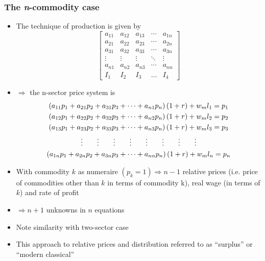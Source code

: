 \documentclass[a4paper,twoside]{article}
\numberwithin{equation}{section}
\numberwithin{figure}{section}
\begin{document}
\subsubsection{The \textit{n}-commodity case}
	\begin{itemize}
		\item The technique of production is given by
		\[
			\begin{bmatrix}
				a_{11} & a_{12} & a_{13} & \cdots & a_{1n} \\
				a_{21} & a_{22} & a_{23} & \cdots & a_{2n} \\
				a_{31} & a_{32} & a_{33} & \cdots & a_{3n} \\
				\vdots & \vdots & \vdots & \ddots & \vdots \\
				a_{n1} & a_{n2} & a_{n3} & \cdots & a_{nn} \\
				I_1 & I_2 & I_3 & \dots & I_4
			\end{bmatrix}
		\]
		\item \( \Rightarrow \) the n-sector price system is
		\begin{gather}
			\left( a_{11} p_1 + a_{21} p_2 + a_{31} p_3 + \dots + a_{n1} p_n \right) \left( 1 + r \right) + w_m l_1 = p_1 \notag \\ 
			\left( a_{12} p_1 + a_{22} p_2 + a_{32} p_3 + \dots + a_{n2} p_n \right) \left( 1 + r \right) + w_m l_2 = p_2 \notag \\ 
			\left( a_{13} p_1 + a_{23} p_2 + a_{33} p_3 + \dots + a_{n3} p_n \right) \left( 1 + r \right) + w_m l_3 = p_3 \notag \\
			\vdots \qquad \vdots \qquad \vdots \qquad \vdots \qquad \vdots \qquad \vdots \qquad \vdots \qquad \vdots \notag \\
			\left( a_{1n} p_1 + a_{2n} p_2 + a_{3n} p_3 + \dots + a_{nn} p_n \right) \left( 1 + r \right) + w_m l_n = p_n \label{E:2.5}
		\end{gather}
		\item With commodity \( k \) as numeraire \( (p_k = 1) \Rightarrow n-1 \) relative prices (i.e. price of commodities other than \( k \) in terms of commodity k), real wage (in terms of \( k \)) and rate of profit
		\item \( \Rightarrow n+1 \) unknowns in \( n \) equations
		\item Note similarity with two-sector case
		\item This approach to relative prices and distribution referred to as ``\textcolor{myred}{surplus}'' or ``\textcolor{myred}{modern classical}''
		\begin{enumerate}[(i)]

\end{enumerate}
\end{itemize}
\end{document}
